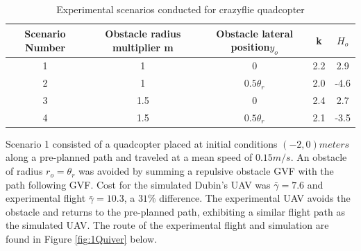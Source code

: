 \documentclass[numbered,pdftex]{ohio-etd}
\begin{document}
\begin{table}[H]
	\centering
	\caption{Experimental scenarios conducted for crazyflie quadcopter}
	\label{table:flightScenarios}
	\begin{tabular}{|c|c|c|c|c|}
		\hline
		Scenario Number & Obstacle radius multiplier m   & Obstacle lateral position$y_o$             & k   & $H_o$ \\ \hline
		1               & 1   & 0              & 2.2 & 2.9   \\ \hline
		2               & 1   & $0.5 \theta_r$ & 2.0 & -4.6  \\ \hline
		3               & 1.5 & 0              & 2.4 & 2.7   \\ \hline
		4               & 1.5 & $0.5 \theta_r$ & 2.1 & -3.5  \\ \hline
	\end{tabular}
\end{table}


Scenario 1 consisted of a quadcopter placed at initial conditions $(-2,0) meters$ along a pre-planned path and traveled at a mean speed of $0.15 m/s$. An obstacle of radius $r_o = \theta_r$ was avoided by summing a repulsive obstacle GVF with the path following GVF. Cost for the simulated Dubin's UAV was $\bar{\gamma} = 7.6$ and experimental flight $\bar{\gamma} = 10.3$, a $31 \%$ difference. The experimental UAV avoids the obstacle and returns to the pre-planned path, exhibiting a similar flight path as the simulated UAV. The route of the experimental flight and simulation are found in Figure \ref{fig:1Quiver} below.
\end{document}
